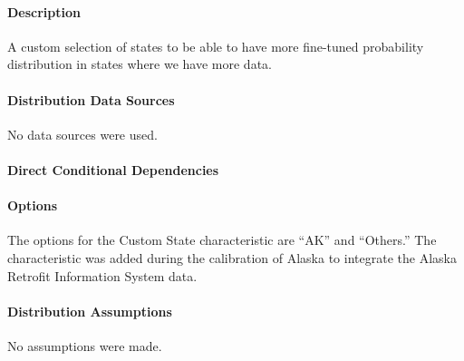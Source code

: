 \paragraph{Description}
% 
A custom selection of states to be able to have more fine-tuned probability distribution in states where we have more data.

\paragraph{Distribution Data Sources}
% 
No data sources were used.

\paragraph{Direct Conditional Dependencies}


\paragraph{Options}
The options for the Custom State characteristic are ``AK'' and ``Others.'' The characteristic was added during the calibration of Alaska to integrate the Alaska Retrofit Information System data.

\paragraph{Distribution Assumptions}
% 
No assumptions were made.

